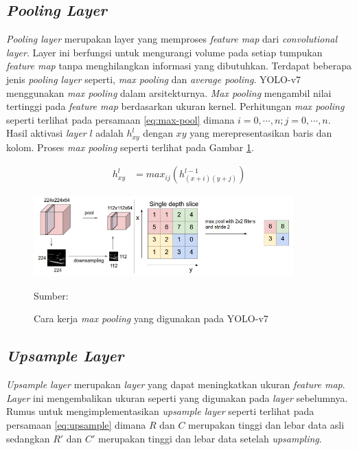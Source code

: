     \subsection{\textit{Pooling Layer}}
    \textit{Pooling layer} merupakan layer yang memproses \textit{feature map} dari \textit{convolutional layer}. Layer ini berfungsi untuk mengurangi volume pada setiap tumpukan \textit{feature map} tanpa menghilangkan informasi yang dibutuhkan. Terdapat beberapa jenis \textit{pooling layer} seperti, \textit{max pooling} dan \textit{average pooling}. YOLO-v7 menggunakan \textit{max pooling} dalam arsitekturnya. \textit{Max pooling} mengambil nilai tertinggi pada \textit{feature map} berdasarkan ukuran kernel. Perhitungan \textit{max pooling} seperti terlihat pada persamaan \ref{eq:max-pool} dimana $i=0, \cdots, n;j=0, \cdots, n$. Hasil aktivasi \textit{layer} $l$ adalah $h^{l}_{xy}$ dengan $xy$ yang merepresentasikan baris dan kolom. Proses \textit{max pooling} seperti terlihat pada Gambar \ref{fig:max-pool}.

    \begin{align}
        \label{eq:max-pool}
        h^{l}_{xy} &= max_{ij}(h^{l-1}_{(x+i)(y+j)})
    \end{align}

    \begin{figure}[H]
        \centering
        \includegraphics[width=10cm]{../img/Max Pooling - Latex.png}
        \caption{Cara kerja \textit{max pooling} yang digunakan pada YOLO-v7}
        \label{fig:max-pool}
        Sumber: \citep{Yani2019}
    \end{figure}

    \subsection{\textit{Upsample Layer}}
    \textit{Upsample layer} merupakan \textit{layer} yang dapat meningkatkan ukuran \textit{feature map}. \textit{Layer} ini mengembalikan ukuran seperti yang digunakan pada \textit{layer} sebelumnya. Rumus untuk mengimplementasikan \textit{upsample layer} seperti terlihat pada persamaan \ref{eq:upsample} dimana $R$ dan $C$ merupakan tinggi dan lebar data asli sedangkan $R'$ dan $C'$ merupakan tinggi dan lebar data setelah \textit{upsampling}.

